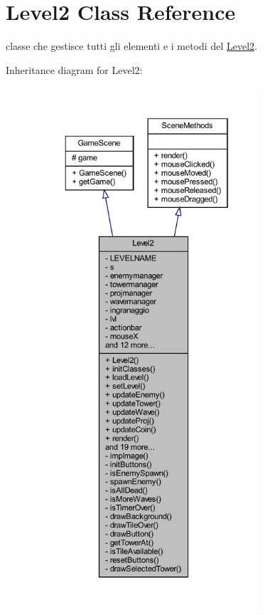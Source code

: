 \hypertarget{classscenes_1_1_level2}{}\section{Level2 Class Reference}
\label{classscenes_1_1_level2}


classe che gestisce tutti gli elementi e i metodi del \hyperlink{classscenes_1_1_level2}{Level2}.  




Inheritance diagram for Level2\+:\nopagebreak
\begin{figure}[H]
\begin{center}
\leavevmode
\includegraphics[height=550pt]{classscenes_1_1_level2__inherit__graph}
\end{center}
\end{figure}


